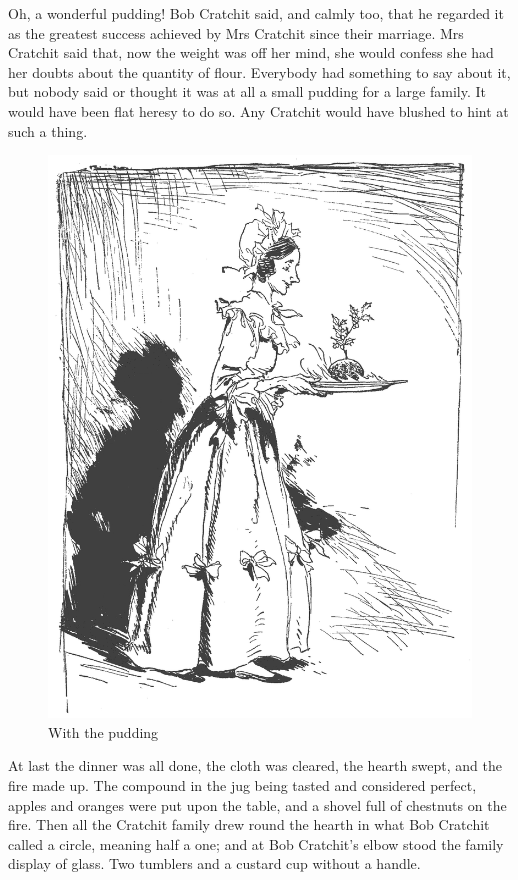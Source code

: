 \documentclass[paper=5.5in:8.5in,BCOR=5mm,twoside,DIV=calc,12pt,usegeometry]{scrbook} %
\begin{document}
Oh, a wonderful pudding! Bob Cratchit said, and calmly too, that he regarded it as the greatest success achieved by Mrs Cratchit since their marriage. Mrs Cratchit said that, now the weight was off her mind, she would confess she had her doubts about the quantity of flour. Everybody had something to say about it, but nobody said or thought it was at all a small pudding for a large family. It would have been flat heresy to do so. Any Cratchit would have blushed to hint at such a thing.

\begin{figure}
\begin{minipage}[c]{\linewidth}
\includegraphics[width=\linewidth]{pudding2}
\caption*{With the pudding}
\end{minipage}
\end{figure}

At last the dinner was all done, the cloth was cleared, the hearth swept, and the fire made up. The compound in the jug being tasted and considered perfect, apples and oranges were put upon the table, and a shovel full of chestnuts on the fire. Then all the Cratchit family drew round the hearth in what Bob Cratchit called a circle, meaning half a one; and at Bob Cratchit's elbow stood the family display of glass. Two tumblers and a custard cup without a handle.
\end{document}
